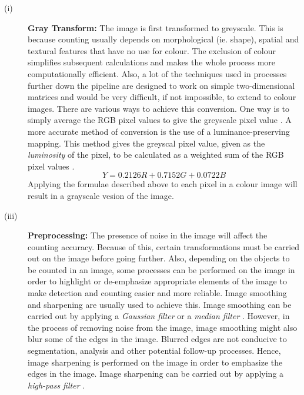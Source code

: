 \begin{description}
\item[(i)] \textbf{Gray Transform:} The image is first transformed to greyscale. This is because counting usually depends on morphological (ie. shape), spatial and textural features that have no use for colour. The exclusion of colour simplifies subsequent calculations and makes the whole process more computationally efficient. Also, a lot of the techniques used in processes further down the pipeline are designed to work on simple two-dimensional matrices and would be very difficult, if not impossible, to extend to colour images. There are various ways to achieve this conversion. One way is to simply average the RGB pixel values to give the greyscale pixel value \cite{REF2}. A more accurate method of conversion is the use of a luminance-preserving mapping. This method gives the greyscal pixel value, given as the \textit{luminosity} of the pixel, to be calculated as a weighted sum of the RGB pixel values \cite{REF3}.
\begin{equation}
Y = 0.2126R + 0.7152G + 0.0722B
\label{eqn:luminosity}
\end{equation}
Applying the formulae described above to each pixel in a colour image will result in a grayscale vesion of the image.\\ 

\item[(iii)] \textbf{Preprocessing:} The presence of noise in the image will affect the counting accuracy. Because of this, certain transformations must be carried out on the image before going further. Also, depending on the objects to be counted in an image, some processes can be performed on the image in order to highlight or de-emphasize appropriate elements of the image to make detection and counting easier and more reliable. Image smoothing and sharpening are usually used to achieve this. Image smoothing can be carried out by applying a \textit{Gaussian filter} \cite{REF4} or a \textit{median filter} \cite{REF5}. However, in the process of removing noise from the image, image smoothing might also blur some of the edges in the image. Blurred edges are not conducive to segmentation, analysis and other potential follow-up processes. Hence, image sharpening is performed on the image in order to emphasize the edges in the image. Image sharpening can be carried out by applying a \textit{high-pass filter} \cite{REF6}.\\


\end{description}
